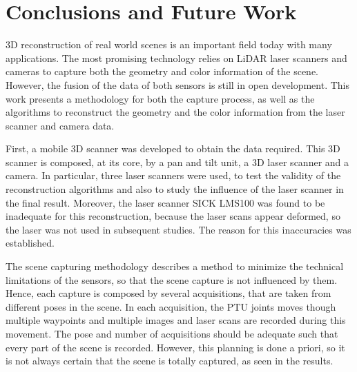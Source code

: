 \chapter{Conclusions and Future Work}
\label{section:conclusions-and-future-work}

\label{Conclusions}
\label{section:conclusions}

3D reconstruction of real world scenes is an important field today with many applications. The most promising technology relies on LiDAR laser scanners and cameras to capture both the geometry and color information of the scene. However, the fusion of the data of both sensors is still in open development. This work presents a methodology for both the capture process, as well as the algorithms to reconstruct the geometry and the color information from the laser scanner and camera data. 

First, a mobile 3D scanner was developed to obtain the data required. This 3D scanner is composed, at its core, by a pan and tilt unit, a 3D laser scanner and a camera. In particular, three laser scanners were used, to test the validity of the reconstruction algorithms and also to study the influence of the laser scanner in the final result. Moreover, the laser scanner SICK LMS100 was found to be inadequate for this reconstruction, because the laser scans appear deformed, so the laser was not used in subsequent studies. The reason for this inaccuracies was established.

The scene capturing methodology describes a method to minimize the technical limitations of the sensors, so that the scene capture is not influenced by them. Hence, each capture is composed by several acquisitions, that are taken from different poses in the scene. In each acquisition, the PTU joints moves though multiple waypoints and multiple images and laser scans are recorded during this movement. The pose and number of acquisitions should be adequate such that every part of the scene is recorded. However, this planning is done a priori, so it is not always certain that the scene is totally captured, as seen in the results.


